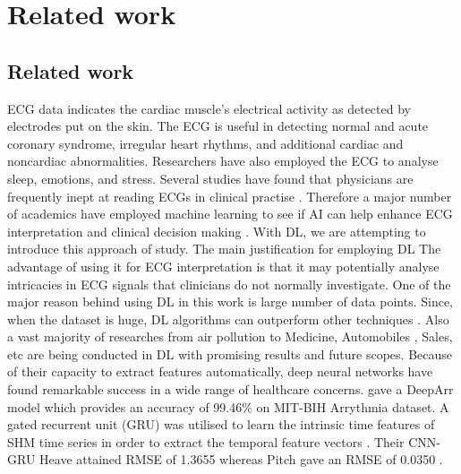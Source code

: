 
\chapter{Related work} %

\label{c2} %


\section{Related work}
ECG data indicates the cardiac muscle's electrical activity as detected by electrodes put on the skin. The ECG is useful in detecting normal and acute coronary syndrome,  irregular heart rhythms,  and additional cardiac and noncardiac abnormalities. Researchers have also employed the ECG to analyse sleep,  emotions,  and stress. Several studies have found that physicians are frequently inept at reading ECGs in clinical practise \cite{bond2012effects}. Therefore a major number of academics have employed machine learning to see if AI can help enhance ECG interpretation and clinical decision making \cite{rjoob2022machine}. With DL,  we are attempting to introduce this approach of study. The main justification for employing DL The advantage of using it for ECG interpretation is that it may potentially analyse intricacies in ECG signals that clinicians do not normally investigate. One of the major reason behind using DL in this work is large number of data points. Since,  when the dataset is huge, DL algorithms can outperform other techniques \cite{purushotham2018benchmarking}. Also a vast majority of researches from air pollution \cite{kumar2022deep} to Medicine,  Automobiles \cite{naqvi2018deep},  Sales\cite{kaneko2016deep},  etc are being conducted in DL with promising results and future scopes.  Because of their capacity to extract features automatically,  deep neural networks have found remarkable success in a wide range of healthcare concerns. \cite{midani2023deeparr} gave a DeepArr model which provides an accuracy of 99.46\% on MIT-BIH Arrythmia dataset. A gated recurrent unit (GRU) was utilised to learn the intrinsic time features of SHM time series in order to extract the temporal feature vectors \cite{li2022hybrid}. Their CNN-GRU Heave attained RMSE of 1.3655 whereas Pitch gave an RMSE of 0.0350 . 
